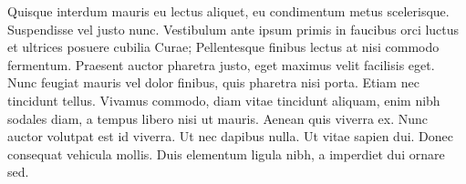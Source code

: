 		Quisque interdum mauris eu lectus aliquet, eu condimentum metus scelerisque. Suspendisse vel justo nunc. Vestibulum ante ipsum primis in faucibus orci luctus et ultrices posuere cubilia Curae; Pellentesque finibus lectus at nisi commodo fermentum. Praesent auctor pharetra justo, eget maximus velit facilisis eget. Nunc feugiat mauris vel dolor finibus, quis pharetra nisi porta. Etiam nec tincidunt tellus. Vivamus commodo, diam vitae tincidunt aliquam, enim nibh sodales diam, a tempus libero nisi ut mauris. Aenean quis viverra ex. Nunc auctor volutpat est id viverra. Ut nec dapibus nulla. Ut vitae sapien dui. Donec consequat vehicula mollis. Duis elementum ligula nibh, a imperdiet dui ornare sed. 